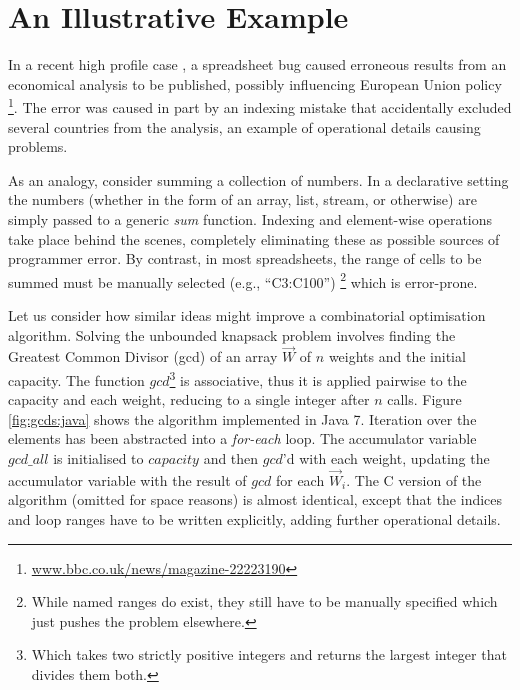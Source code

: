 \section{An Illustrative Example}
In a recent high profile case \cite{Herndon13}, a spreadsheet bug caused
erroneous results from an economical analysis to be published, possibly
influencing European Union policy%
\footnote{\url{www.bbc.co.uk/news/magazine-22223190}}.
The error was caused in part by an indexing mistake that accidentally excluded
several countries from the analysis, an example of operational details causing
problems.

As an analogy, consider summing a collection of numbers. In a declarative
setting
the numbers (whether in the form of an array, list, stream, or
otherwise) are simply passed to a generic \emph{sum} function. Indexing and
element-wise operations take place behind the scenes, completely eliminating
these as possible sources of programmer error. By contrast, in most spreadsheets, the range of cells to
be summed must be manually selected (e.g., ``C3:C100'')%
\footnote{While named ranges do exist, they still have to be manually specified
which just pushes the problem elsewhere.} which is error-prone.

Let us consider how similar ideas might improve a combinatorial
optimisation algorithm. Solving the unbounded knapsack problem involves
finding the Greatest Common Divisor (gcd) of an array $\vec{W}$ of $n$
weights and the initial capacity. The function $gcd$\footnote{Which takes two strictly positive integers and returns the largest integer that divides them both.}
is associative, thus it is applied pairwise to the capacity and each weight,
reducing to a single integer after $n$ calls. Figure \ref{fig:gcds:java} shows
the algorithm implemented in Java 7. Iteration over the elements has been
abstracted into a \emph{for-each} loop. The accumulator variable $gcd\_all$ is initialised to $capacity$ and then $gcd$'d with each weight, updating the accumulator
variable with the result of $gcd$ for each $\vec{W}_i$. The C version of
the algorithm (omitted for space reasons) is almost identical, except that the indices and loop ranges have to be written explicitly, adding further
operational details.

